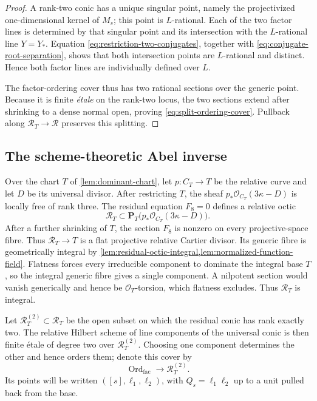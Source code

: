 \documentclass[10pt]{amsart}
\numberwithin{equation}{section}
\theoremstyle{definition}
\theoremstyle{remark}
\newcommand{\PP}{\mathbf P}
\begin{document}
\begin{proof}
A rank-two conic has a unique singular point, namely the projectivized
one-dimensional kernel of $M_s$; this point is $L$-rational.  Each of the
two factor lines is determined by that singular point and its intersection
with the $L$-rational line $Y=Y_*$.  Equation
\eqref{eq:restriction-two-conjugates}, together with
\eqref{eq:conjugate-root-separation}, shows that both intersection points
are $L$-rational and distinct.  Hence both factor lines are individually
defined over $L$.

The factor-ordering cover thus has two rational sections over the generic
point.  Because it is finite \emph{\'etale} on the rank-two locus, the two
sections extend after shrinking to a dense normal open, proving
\eqref{eq:split-ordering-cover}.  Pullback along $\mathscr R_T\to\mathscr R$
preserves this splitting.
\end{proof}

\subsection{The scheme-theoretic Abel inverse}

Over the chart $T$ of \cref{lem:dominant-chart}, let
$p:C_T\to T$ be the relative curve and let $D$ be its universal divisor.
After restricting $T$, the sheaf
$p_*\mathcal O_{C_T}(3\kappa-D)$ is locally free of rank three.  The
residual equation $F_8=0$ defines a relative octic
\[
 \mathscr R_T\subset
 \PP_T\bigl(p_*\mathcal O_{C_T}(3\kappa-D)\bigr).
\]
After a further shrinking of $T$, the section $F_8$ is nonzero on every
projective-space fibre.  Thus $\mathscr R_T\to T$ is a flat projective
relative Cartier divisor.  Its generic fibre is geometrically integral by
\cref{lem:residual-octic-integral,lem:normalized-function-field}.  Flatness
forces every irreducible component to dominate the integral base $T$, so the
integral generic fibre gives a single component.  A nilpotent section would
vanish generically and hence be $\mathcal O_T$-torsion, which flatness
excludes.  Thus $\mathscr R_T$ is integral.

Let $\mathscr R_T^{(2)}\subset\mathscr R_T$ be the open subset on which the
residual conic has rank exactly two.  The relative Hilbert scheme of line
components of the universal conic is then finite \'etale of degree two over
$\mathscr R_T^{(2)}$.  Choosing one component determines the other and hence
orders them; denote this cover by
\[
 \operatorname{Ord}_{\mathrm{fac}}
    \longrightarrow\mathscr R_T^{(2)}.
\]
Its points will be written $([s],\ell_1,\ell_2)$, with
$Q_s=\ell_1\ell_2$ up to a unit pulled back from the base.
\end{document}
